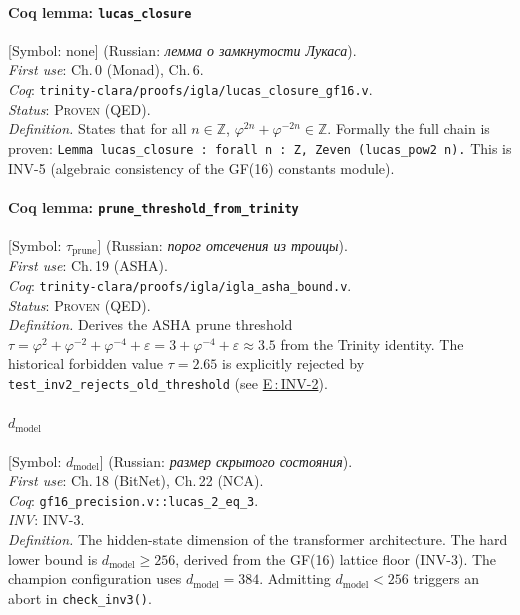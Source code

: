 \paragraph*{\textmd{\textbf{Coq lemma: \texttt{lucas\_closure}}}}
\label{entry:coq-lucas-closure}
[Symbol: none] (Russian: \textit{лемма о замкнутости Лукаса}).\\
\textit{First use}: Ch.\,0 (Monad), Ch.\,6.\\
\textit{Coq}: \texttt{trinity-clara/proofs/igla/lucas\_closure\_gf16.v}.\\
\textit{Status}: \textsc{Proven} (QED).\\
\textit{Definition.}
States that for all $n \in \mathbb{Z}$,
$\varphi^{2n} + \varphi^{-2n} \in \mathbb{Z}$.
Formally the full chain is proven:
\texttt{Lemma lucas\_closure : forall n : Z, Zeven (lucas\_pow2 n).}
This is INV-5 (algebraic consistency of the GF(16) constants module).

\paragraph*{\textmd{\textbf{Coq lemma: \texttt{prune\_threshold\_from\_trinity}}}}
\label{entry:coq-prune}
[Symbol: $\tau_\mathrm{prune}$] (Russian: \textit{порог отсечения из троицы}).\\
\textit{First use}: Ch.\,19 (ASHA).\\
\textit{Coq}: \texttt{trinity-clara/proofs/igla/igla\_asha\_bound.v}.\\
\textit{Status}: \textsc{Proven} (QED).\\
\textit{Definition.}
Derives the ASHA prune threshold $\tau = \varphi^2 + \varphi^{-2}
+ \varphi^{-4} + \varepsilon = 3 + \varphi^{-4} + \varepsilon \approx 3.5$
from the Trinity identity.
The historical forbidden value $\tau = 2.65$ is explicitly rejected
by \texttt{test\_inv2\_rejects\_old\_threshold} (see
\hyperref[entry:inv2]{E\,:\,INV-2}).

\paragraph*{\textmd{\textbf{$d_{\mathrm{model}}$}}}
\label{entry:dmodel}
[Symbol: $d_{\mathrm{model}}$] (Russian: \textit{размер скрытого состояния}).\\
\textit{First use}: Ch.\,18 (BitNet), Ch.\,22 (NCA).\\
\textit{Coq}: \texttt{gf16\_precision.v::lucas\_2\_eq\_3}.\\
\textit{INV}: INV-3.\\
\textit{Definition.}
The hidden-state dimension of the transformer architecture.
The hard lower bound is $d_{\mathrm{model}} \ge 256$, derived from the
GF(16) lattice floor (INV-3).
The champion configuration uses $d_{\mathrm{model}} = 384$.
Admitting $d_{\mathrm{model}} < 256$ triggers an abort in
\texttt{check\_inv3()}.

